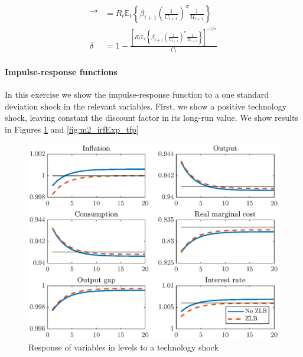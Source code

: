 \documentclass[12pt]{article}
\numberwithin{equation}{section}
\begin{document}
\begin{align*}
	[C_t(1-\delta)]^{-\sigma}&=R_t\mathbb{E}_t\left\{\beta_{t+1}\left(\frac{1}{C_{t+1}}\right)^{\sigma}\frac{1}{\Pi_{t+1}}\right\}\\
	\delta&=1-\frac{\left[R_t\mathbb{E}_t\left\{\beta_{t+1}\left(\frac{1}{C_{t+1}}\right)^{\sigma}\frac{1}{\Pi_{t+1}}\right\}\right]^{-1/\sigma}}{C_t}
\end{align*}



\paragraph{Impulse-response functions} In this exercise we show the impulse-response function to a one standard deviation shock in the relevant variables. First, we show a positive technology shock, leaving constant the discount factor in its long-run value. We show results in Figures \ref{fig:m2_irfLevel_tfp} and \ref{fig:m2_irfExp_tfp}

\begin{figure}[H]
	\centering
	\caption{Response of variables in levels to a technology shock}\label{fig:m2_irfLevel_tfp}
	\includegraphics[scale=0.7]{m2_irfLevel_tfp}
\end{figure}
\end{document}

